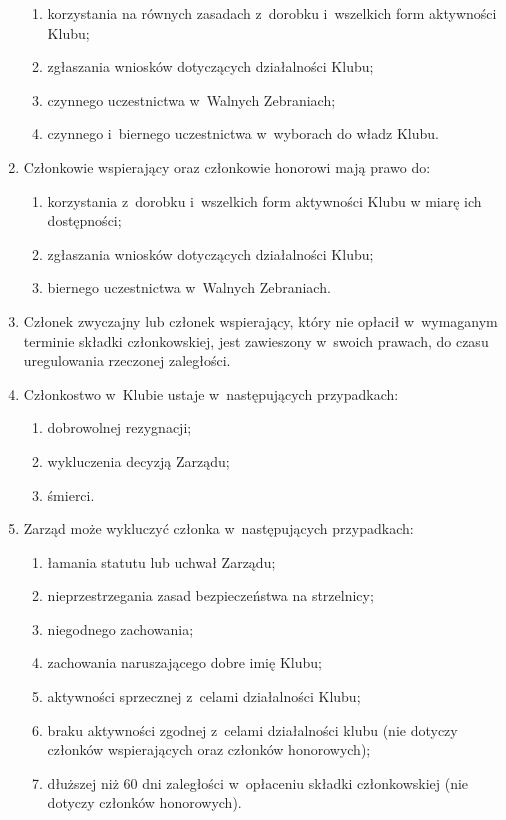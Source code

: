 \begin{enumerate}
    \begin{enumerate}
        \item korzystania na równych zasadach z~dorobku i~wszelkich form aktywności Klubu;
        \item zgłaszania wniosków dotyczących działalności Klubu;
        \item czynnego uczestnictwa w~Walnych Zebraniach;
        \item czynnego i~biernego uczestnictwa w~wyborach do władz Klubu.
    \end{enumerate}
    \item Członkowie wspierający oraz członkowie honorowi mają prawo do:
    \begin{enumerate}
        \item korzystania z~dorobku i~wszelkich form aktywności Klubu w miarę ich dostępności;
        \item zgłaszania wniosków dotyczących działalności Klubu;
        \item biernego uczestnictwa w~Walnych Zebraniach.
    \end{enumerate}
    \item Członek zwyczajny lub członek wspierający, który nie opłacił w~wymaganym terminie składki członkowskiej, jest zawieszony w~swoich prawach, do czasu uregulowania rzeczonej zaległości.
    \item Członkostwo w~Klubie ustaje w~następujących przypadkach:
    \begin{enumerate}
        \item dobrowolnej rezygnacji;
        \item wykluczenia decyzją Zarządu;
        \item śmierci.
    \end{enumerate}
    \item Zarząd może wykluczyć członka w~następujących przypadkach:
    \begin{enumerate}
        \item łamania statutu lub uchwał Zarządu;
        \item nieprzestrzegania zasad bezpieczeństwa na strzelnicy;
        \item niegodnego zachowania;
        \item zachowania naruszającego dobre imię Klubu;
        \item aktywności sprzecznej z~celami działalności Klubu;
        \item braku aktywności zgodnej z~celami działalności klubu (nie dotyczy członków wspierających oraz członków honorowych);
        \item dłuższej niż 60 dni zaległości w~opłaceniu składki członkowskiej (nie dotyczy członków honorowych).
    \end{enumerate}
\end{enumerate}